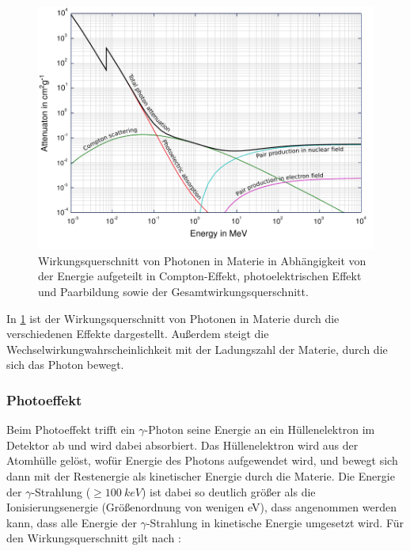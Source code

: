 \documentclass[
	a4paper,
	12pt,
	pagesize,
	ngerman
]{scrartcl}
\begin{document}
	\begin{figure}[H]
			\includegraphics[width= 1 \linewidth]{charts/interaktion}
			\caption{
				Wirkungsquerschnitt von Photonen in Materie in Abhängigkeit von der Energie aufgeteilt in Compton-Effekt, photoelektrischen Effekt und Paarbildung sowie der Gesamtwirkungsquerschnitt.
				\cite{atomkraft}
			}
			\label{fig_wirkunsquerschnitt_gamma}
	\end{figure}

	In \cref{fig_wirkunsquerschnitt_gamma} ist der Wirkungsquerschnitt von Photonen in Materie durch die verschiedenen Effekte dargestellt.
	Außerdem steigt die Wechselwirkungwahrscheinlichkeit mit der Ladungszahl der Materie, durch die sich das Photon bewegt.


	\subsubsection{Photoeffekt}
	Beim Photoeffekt trifft ein $\gamma$-Photon seine Energie an ein Hüllenelektron im Detektor ab und wird dabei absorbiert.
	Das Hüllenelektron wird aus der Atomhülle gelöst, wofür Energie des Photons aufgewendet wird, und bewegt sich dann mit der Restenergie als kinetischer Energie durch die Materie.
	Die Energie der $\gamma$-Strahlung ($\ge \SI{100}{keV}$) ist dabei so deutlich größer als die Ionisierungsenergie (Größenordnung von wenigen \si{}{eV}), dass angenommen werden kann, dass alle Energie der $\gamma$-Strahlung in kinetische Energie umgesetzt wird.
	Für den Wirkungsquerschnitt gilt nach \cite{queensu}:
\end{document}
